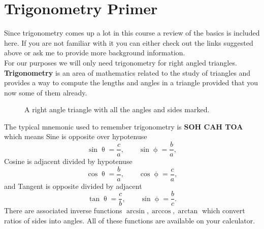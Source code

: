 \section{Trigonometry Primer}
Since trigonometry comes up a lot in this course a review of the basics is included here. If you are not familiar with it you can either check out the links suggested above or ask me to provide more background information.\\

For our purposes we will only need trigonometry for right angled triangles. \textbf{Trigonometry} is an area of mathematics related to the study of triangles and provides a way to compute the lengths and angles in a triangle provided that you now some of them already.

\begin{figure}[ht]
    \centering
    \caption{A right angle triangle with all the angles and sides marked.}
    \label{fig: Trig definitions}
\end{figure}

The typical mnemonic used to remember trigonometry is \textbf{SOH CAH TOA} which means Sine is opposite over hypotenuse
\begin{equation*}
\sin\uptheta=\frac{c}{a}, \qquad \sin\upphi =\frac{b}{a},
\end{equation*}
Cosine is adjacent divided by hypotenuse
\begin{equation*}
\cos\uptheta=\frac{b}{a}, \qquad \cos\upphi =\frac{c}{a},
\end{equation*}
and Tangent is opposite divided by adjacent
\begin{equation*}
\tan\uptheta=\frac{c}{b}, \qquad \sin\upphi =\frac{b}{c}.
\end{equation*}
There are associated inverse functions $\arcsin,\arccos,\arctan$ which convert ratios of sides into angles. All of these functions are available on your calculator. \\

